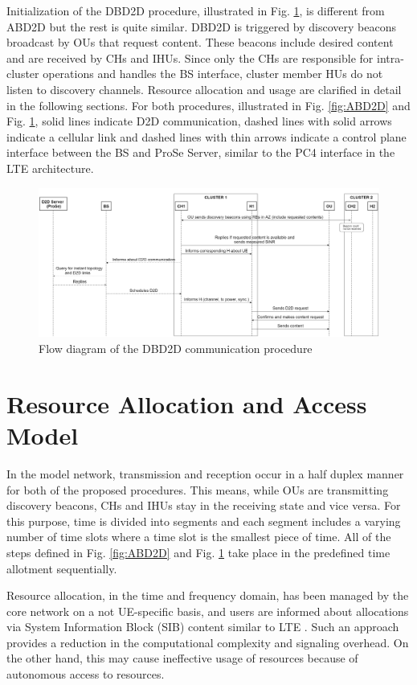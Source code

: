 \documentclass[10pt,a4paper,twocolumn]{article}
\begin{document}
Initialization of the DBD2D procedure, illustrated in Fig. \ref{fig:DBD2D}, is different from ABD2D but the rest is quite similar. DBD2D is triggered by discovery beacons broadcast by OUs that request content. These beacons include desired content and are received by CHs and IHUs. Since only the CHs are responsible for intra-cluster operations and handles the BS interface, cluster member HUs do not listen to discovery channels. Resource allocation and usage are clarified in detail in the following sections.
For both procedures, illustrated in Fig. \ref{fig:ABD2D} and Fig. \ref{fig:DBD2D}, solid lines indicate D2D communication, dashed lines with solid arrows indicate a cellular link and dashed lines with thin arrows indicate a control plane interface between the BS and ProSe Server, similar to the PC4 interface in the LTE architecture. 

\begin{figure}
	\includegraphics[width=\textwidth]{DBD2D.png}
	\caption{Flow diagram of the DBD2D communication procedure}
	\label{fig:DBD2D}
\end{figure}

\section{Resource Allocation and Access Model}

In the model network, transmission and reception occur in a half duplex manner for both of the proposed procedures. This means, while OUs are transmitting discovery beacons, CHs and IHUs stay in the receiving state and vice versa. For this purpose, time is divided into segments and each segment includes a varying number of time slots where a time slot is the smallest piece of time. All of the steps defined in Fig. \ref{fig:ABD2D} and Fig. \ref{fig:DBD2D} take place in the predefined time allotment sequentially.

Resource allocation, in the time and frequency domain, has been managed by the core network on a not UE-specific basis, and users are informed about allocations via System Information Block (SIB) content similar to LTE \cite{36843}. Such an approach provides a reduction in the computational complexity and signaling overhead. On the other hand, this may cause ineffective usage of resources because of autonomous access to resources.
\end{document}
